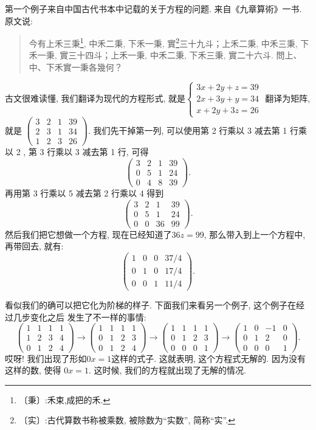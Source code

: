 第一个例子来自中国古代书本中记载的关于方程的问题. 来自《九章算術》一书. 原文说: 
\begin{quote}
    今有上禾三秉\footnote{〔秉〕:禾束,成把的禾.}, 中禾二秉, 下禾一秉, 實\footnote{〔实〕:古代算数书称被乘数, 被除数为``实数'', 简称``实''.}三十九斗；上禾二秉, 中禾三秉, 下禾一秉, 實三十四斗；上禾一秉, 中禾二秉, 下禾三秉, 實二十六斗. 問上、中、下禾實一秉各幾何？ 
\end{quote}
古文很难读懂, 我们翻译为现代的方程形式, 就是$\begin{cases}
    3x+2y+z=39\\
    2x+3y+y=34\\
    x+2y+3z=26
    \end{cases}$
翻译为矩阵, 就是
$\left(\begin{array}{cccc}3&2&1&39\\2&3&1&34\\1&2&3&26\end{array}\right)$. 我们先干掉第一列, 可以使用第 2 行乘以 3 减去第 1 
行乘以 2 , 第 3 行乘以 3 减去第 1 行, 可得
$$
\left(\begin{array}{cccc}3&2&1&39\\0&5&1&24\\0&4&8&39\end{array}\right).
$$
再用第 3 行乘以 5 减去第 2 行乘以 4 得到
$$
\left(\begin{array}{cccc}3&2&1&39\\0&5&1&24\\0&0&36&99\end{array}\right).
$$
然后我们把它想做一个方程, 现在已经知道了$36z=99$, 那么带入到上一个方程中, 再带回去, 就有: 
$$
\left(\begin{array}{cccc}1&0&0&37/4\\0&1&0&17/4\\0&0&1&11/4\end{array}\right).
$$

看似我们的确可以把它化为阶梯的样子. 下面我们来看另一个例子, 这个例子在经过几步变化之后
发生了不一样的事情: 
$$
\left(\begin{array}{cccc}1&1&1&1\\1&2&3&4\\0&1&2&4\end{array}\right)\to\left(\begin{array}{cccc}1&1&1&1\\0&1&2&3\\0&1&2&4\end{array}\right)\to\left(\begin{array}{cccc}1&1&1&1\\0&1&2&3\\0&0&0&1\end{array}\right)\to\left(\begin{array}{cccc}1&0&-1&0\\0&1&2&0\\0&0&0&1\end{array}\right). 
$$
哎呀! 我们出现了形如$0x=1$这样的式子. 这就表明, 这个方程式无解的. 因为没有这样的数, 使得 
$0x=1$. 这时候, 我们的方程就出现了无解的情况. 

